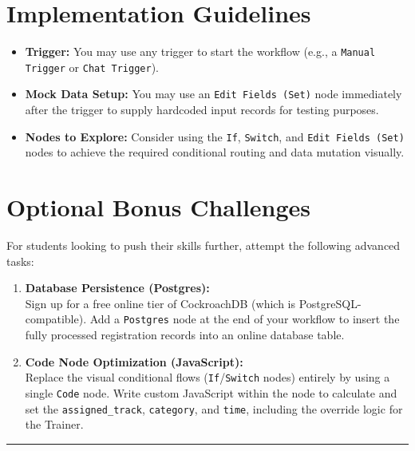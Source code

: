 \documentclass[11pt,a4paper]{article}
\begin{document}
\section*{Implementation Guidelines}
\begin{itemize}
    \item \textbf{Trigger:} You may use any trigger to start the workflow (e.g., a \texttt{Manual Trigger} or \texttt{Chat Trigger}).
    \item \textbf{Mock Data Setup:} You may use an \texttt{Edit Fields (Set)} node immediately after the trigger to supply hardcoded input records for testing purposes.
    \item \textbf{Nodes to Explore:} Consider using the \texttt{If}, \texttt{Switch}, and \texttt{Edit Fields (Set)} nodes to achieve the required conditional routing and data mutation visually.
\end{itemize}

\section*{Optional Bonus Challenges}
For students looking to push their skills further, attempt the following advanced tasks:
\begin{enumerate}[label=\textbf{Bonus \arabic*:}]
    \item \textbf{Database Persistence (Postgres):} \\
    Sign up for a free online tier of CockroachDB (which is PostgreSQL-compatible). Add a \texttt{Postgres} node at the end of your workflow to insert the fully processed registration records into an online database table.
    
    \item \textbf{Code Node Optimization (JavaScript):} \\
    Replace the visual conditional flows (\texttt{If}/\texttt{Switch} nodes) entirely by using a single \texttt{Code} node. Write custom JavaScript within the node to calculate and set the \texttt{assigned\_track}, \texttt{category}, and \texttt{time}, including the override logic for the Trainer.
\end{enumerate}

\vspace{2em}
\hrule
\vspace{1em}
\end{document}
